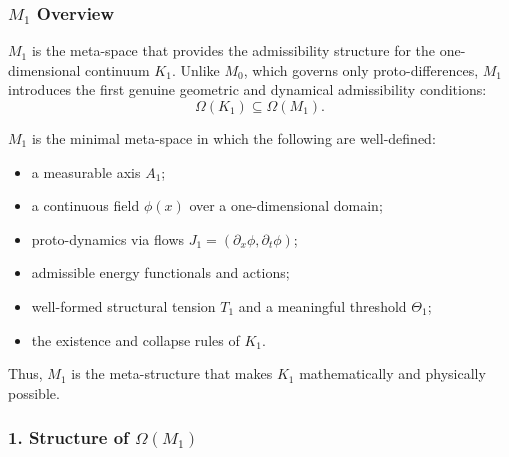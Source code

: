 

\subsubsection{\texorpdfstring{$M_1$}{M_1} Overview}
\label{sec:m1-overview}

$M_1$ is the meta-space that provides the admissibility structure for the
one-dimensional continuum $K_1$.  
Unlike $M_0$, which governs only proto-differences, $M_1$ introduces the
first genuine geometric and dynamical admissibility conditions:
\[
\Omega(K_1) \subseteq \Omega(M_1).
\]

$M_1$ is the minimal meta-space in which the following are well-defined:

\begin{itemize}
    \item a measurable axis $A_1$;
    \item a continuous field $\phi(x)$ over a one-dimensional domain;
    \item proto-dynamics via flows $J_1=(\partial_x \phi, \partial_t \phi)$;
    \item admissible energy functionals and actions;
    \item well-formed structural tension $T_1$ and a meaningful threshold $\Theta_1$;
    \item the existence and collapse rules of $K_1$.
\end{itemize}

Thus, $M_1$ is the meta-structure that makes $K_1$ mathematically and physically possible.

\subsubsection*{1. Structure of \texorpdfstring{$\Omega(M_1)$}{\Omega(M_1)}}

